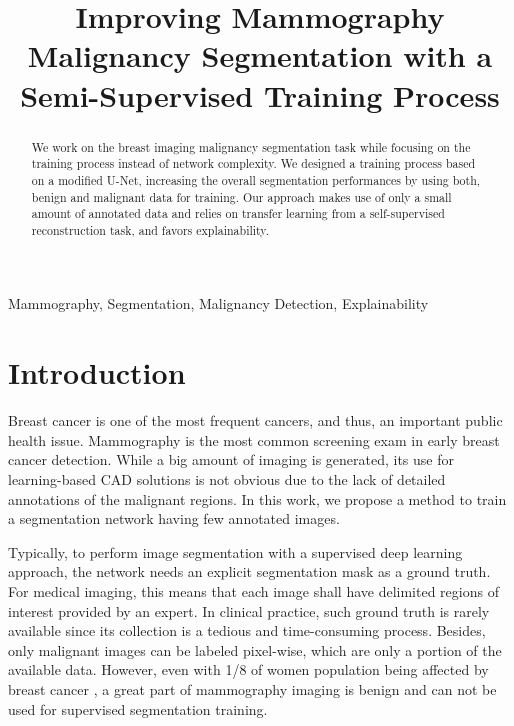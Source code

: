\documentclass{midl} %
\title[Improving Mammography Malignancy Segmentation ]{Improving Mammography Malignancy Segmentation with a Semi-Supervised Training Process}
\begin{document}
\maketitle
\vspace{-0.5cm}
\begin{abstract}
We work on the breast imaging malignancy segmentation task while focusing on the training process instead of network complexity. We designed a training process based on a modified U-Net, increasing the overall segmentation performances by using both, benign and malignant data for training. Our approach makes use of only a small amount of annotated data and relies on transfer learning from a self-supervised reconstruction task, and favors explainability. 

\end{abstract}

\begin{keywords}
Mammography, Segmentation, Malignancy Detection, Explainability
\end{keywords}

\section{Introduction}
\label{sec:intro}

Breast cancer is one of the most frequent cancers, and thus, an important public health issue. Mammography is the most common screening exam in early breast cancer detection. While a big amount of imaging is generated, its use for learning-based CAD solutions is not obvious due to the lack of detailed annotations of the malignant regions. In this work, we propose a method to train a segmentation network having few annotated images. 

Typically, to perform image segmentation with a supervised deep learning approach, the network needs an explicit segmentation mask as a ground truth. For medical imaging, this means that each image shall have delimited regions of interest provided by an expert. In clinical practice, such ground truth is rarely available since its collection is a tedious and time-consuming process. Besides, only malignant images can be labeled pixel-wise, which are only a portion of the available data. However, even with 1/8 of women population being affected by breast cancer \cite{Siegel2019}, a great part of mammography imaging is benign and can not be used for supervised segmentation training.
\end{document}
